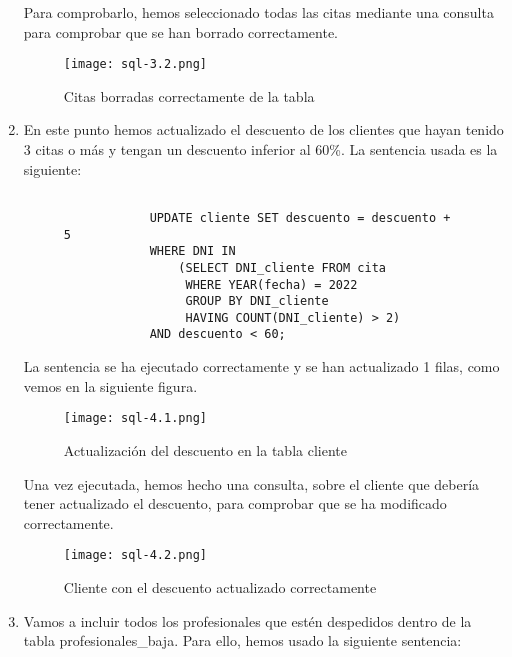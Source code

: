 \begin{enumerate}
    Para comprobarlo, hemos seleccionado todas las citas mediante una consulta para comprobar que se han borrado correctamente.

    \begin{figure}[H]
        \centering
        \texttt{[image: sql-3.2.png]}
        \caption{Citas borradas correctamente de la tabla}
    \end{figure}

    \item En este punto hemos actualizado el descuento de los clientes que hayan tenido 3 citas o más y tengan un descuento inferior al 60\%. La sentencia usada es la siguiente:

     \begin{figure}[H]
        \begin{tcolorbox}[sharp corners, colback=yellow!30, colframe=white!20]
            \scriptsize
            \begin{verbatim}

            UPDATE cliente SET descuento = descuento + 5
            WHERE DNI IN
                (SELECT DNI_cliente FROM cita
                 WHERE YEAR(fecha) = 2022
                 GROUP BY DNI_cliente
                 HAVING COUNT(DNI_cliente) > 2)
            AND descuento < 60;
            \end{verbatim}
        \end{tcolorbox}
    \end{figure}

    La sentencia se ha ejecutado correctamente y se han actualizado 1 filas, como vemos en la siguiente figura.

    \begin{figure}[H]
        \centering
        \texttt{[image: sql-4.1.png]}
        \caption{Actualización del descuento en la tabla cliente}
    \end{figure}

    Una vez ejecutada, hemos hecho una consulta, sobre el cliente que debería tener actualizado el descuento, para comprobar que se ha modificado correctamente.

    \begin{figure}[H]
        \centering
        \texttt{[image: sql-4.2.png]}
        \caption{Cliente con el descuento actualizado correctamente}
    \end{figure}

    \item Vamos a incluir todos los profesionales que estén despedidos dentro de la tabla profesionales\_baja. Para ello, hemos usado la siguiente sentencia:


\end{enumerate}
